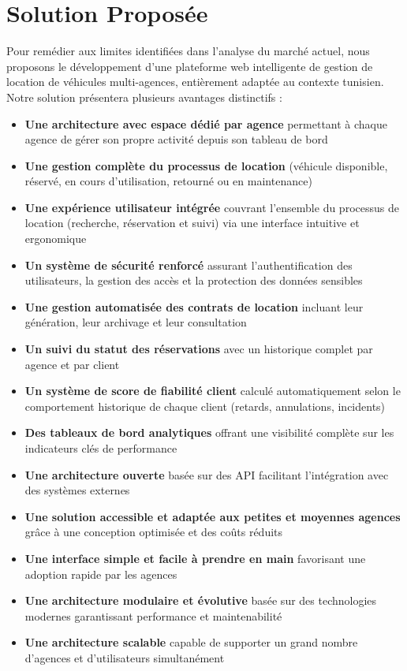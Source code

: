 \section{Solution Proposée}
\label{sec:solution}

Pour remédier aux limites identifiées dans l'analyse du marché actuel, nous proposons le développement d'une plateforme web intelligente de gestion de location de véhicules multi-agences, entièrement adaptée au contexte tunisien. Notre solution présentera plusieurs avantages distinctifs :

\begin{itemize}[noitemsep, topsep=0pt]
    \item \textbf{Une architecture avec espace dédié par agence} permettant à chaque agence de gérer son propre activité depuis son tableau de bord
    \item \textbf{Une gestion complète du processus de location} (véhicule disponible, réservé, en cours d'utilisation, retourné ou en maintenance)
    \item \textbf{Une expérience utilisateur intégrée} couvrant l’ensemble du processus de location (recherche, réservation et suivi) via une interface intuitive et ergonomique
    \item \textbf{Un système de sécurité renforcé} assurant l’authentification des utilisateurs, la gestion des accès et la protection des données sensibles
    \item \textbf{Une gestion automatisée des contrats de location} incluant leur génération, leur archivage et leur consultation
    \item \textbf{Un suivi du statut des réservations} avec un historique complet par agence et par client
    \item \textbf{Un système de score de fiabilité client} calculé automatiquement selon le comportement historique de chaque client (retards, annulations, incidents)
    \item \textbf{Des tableaux de bord analytiques} offrant une visibilité complète sur les indicateurs clés de performance
    \item \textbf{Une architecture ouverte} basée sur des API facilitant l’intégration avec des systèmes externes
    \item \textbf{Une solution accessible et adaptée aux petites et moyennes agences} grâce à une conception optimisée et des coûts réduits
    \item \textbf{Une interface simple et facile à prendre en main} favorisant une adoption rapide par les agences
    \item \textbf{Une architecture modulaire et évolutive} basée sur des technologies modernes garantissant performance et maintenabilité
    \item \textbf{Une architecture scalable} capable de supporter un grand nombre d’agences et d’utilisateurs simultanément
\end{itemize}

